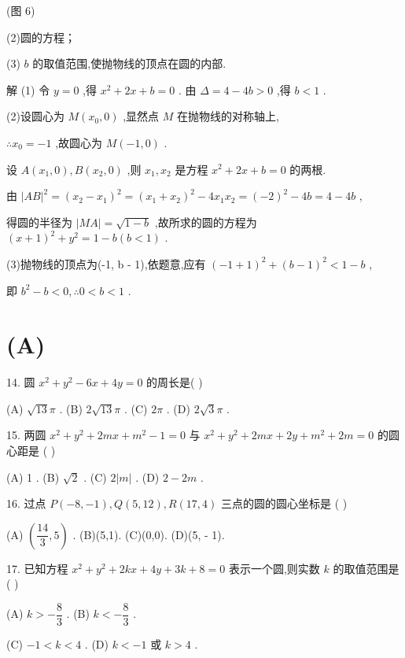 (图 6)

(2)圆的方程；

(3) $b$ 的取值范围,使抛物线的顶点在圆的内部.

解 (1) 令 $y = 0$ ,得 ${x}^{2} + {2x} + b = 0$ . 由 $\Delta  = 4 - {4b} > 0$ ,得 $b < 1$ .

(2)设圆心为 $M\left( {{x}_{0},0}\right)$ ,显然点 $M$ 在抛物线的对称轴上,

$\therefore {x}_{0} =  - 1$ ,故圆心为 $M\left( {-1,0}\right)$ .

设 $A\left( {{x}_{1},0}\right) ,B\left( {{x}_{2},0}\right)$ ,则 ${x}_{1},{x}_{2}$ 是方程 ${x}^{2} + {2x} + b = 0$ 的两根.

由 ${\left| AB\right| }^{2} = {\left( {x}_{2} - {x}_{1}\right) }^{2} = {\left( {x}_{1} + {x}_{2}\right) }^{2} - 4{x}_{1}{x}_{2} = {\left( -2\right) }^{2} - {4b} = 4 - {4b}$ ,

得圆的半径为 $\left| {MA}\right|  = \sqrt{1 - b}$ ,故所求的圆的方程为 ${\left( x + 1\right) }^{2} + {y}^{2} = 1 - b\left( {b < 1}\right)$ .

(3)抛物线的顶点为(-1, b - 1),依题意,应有 ${\left( -1 + 1\right) }^{2} + {\left( b - 1\right) }^{2} < 1 - b$ ,

即 ${b}^{2} - b < 0,\therefore 0 < b < 1$ .

\section*{(A)}

14. 圆 ${x}^{2} + {y}^{2} - {6x} + {4y} = 0$ 的周长是(   )

(A) $\sqrt{13}\pi$ . (B) $2\sqrt{13}\pi$ . (C) ${2\pi }$ . (D) $2\sqrt{3}\pi$ .

15. 两圆 ${x}^{2} + {y}^{2} + {2mx} + {m}^{2} - 1 = 0$ 与 ${x}^{2} + {y}^{2} + {2mx} + {2y} + {m}^{2} + {2m} = 0$ 的圆心距是 (   )

(A) 1 . (B) $\sqrt{2}$ . (C) $2\left| m\right|$ . (D) $2 - {2m}$ .

16. 过点 $P\left( {-8, - 1}\right) ,Q\left( {5,{12}}\right) ,R\left( {{17},4}\right)$ 三点的圆的圆心坐标是 (   )

(A) $\left( {\dfrac{14}{3},5}\right)$ . (B)(5,1). (C)(0,0). (D)(5, - 1).

17. 已知方程 ${x}^{2} + {y}^{2} + {2kx} + {4y} + {3k} + 8 = 0$ 表示一个圆,则实数 $k$ 的取值范围是 ( )

(A) $k >  - \dfrac{8}{3}$ . (B) $k <  - \dfrac{8}{3}$ .

(C) $- 1 < k < 4$ . (D) $k <  - 1$ 或 $k > 4$ .

